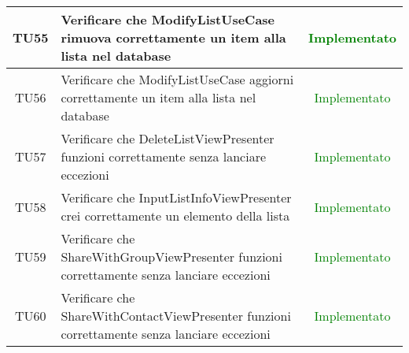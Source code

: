 \begin{center}
\begin{longtable}{|c|>{\centering}m{10cm}|c|}
		TU55 & Verificare che ModifyListUseCase rimuova correttamente un item alla lista nel database & \textcolor{Green}{Implementato}\\ \hline
		TU56 & Verificare che ModifyListUseCase aggiorni correttamente un item alla lista nel database & \textcolor{Green}{Implementato}\\ \hline
		TU57 & Verificare che DeleteListViewPresenter funzioni correttamente senza lanciare eccezioni & \textcolor{Green}{Implementato}\\ \hline
		TU58 & Verificare che InputListInfoViewPresenter crei correttamente un elemento della lista & \textcolor{Green}{Implementato}\\ \hline
		TU59 & Verificare che ShareWithGroupViewPresenter funzioni correttamente senza lanciare eccezioni & \textcolor{Green}{Implementato}\\ \hline
		TU60 & Verificare che ShareWithContactViewPresenter funzioni correttamente senza lanciare eccezioni & \textcolor{Green}{Implementato}\\ \hline
	\end{longtable}
\end{center}
